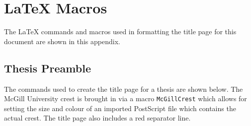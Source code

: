 \resetdatestamp

\chapter{\LaTeX{} Macros}
\label{A:LaTeXmacros}

The \LaTeX{} commands and macros used in formatting the title page for
 this document are shown in this appendix.

\section{Thesis Preamble}

The commands used to create the title page for a thesis are shown
 below.
The McGill University crest is brought in via a macro \verb|McGillCrest|
 which allows for setting the size and colour of an imported PostScript
 file which contains the actual crest.
The title page also includes a red separator line.
